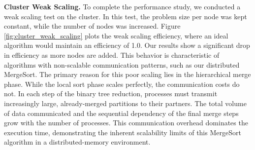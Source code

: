 \documentclass[10pt]{article}
\begin{document}
\textbf{Cluster Weak Scaling.} To complete the performance study, we conducted a weak scaling test on the cluster. In this test, the problem size per node was kept constant, while the number of nodes was increased. Figure \ref{fig:cluster_weak_scaling} plots the weak scaling efficiency, where an ideal algorithm would maintain an efficiency of 1.0. Our results show a significant drop in efficiency as more nodes are added. This behavior is characteristic of algorithms with non-scalable communication patterns, such as our distributed MergeSort. The primary reason for this poor scaling lies in the hierarchical merge phase. While the local sort phase scales perfectly, the communication costs do not. In each step of the binary tree reduction, processes must transmit increasingly large, already-merged partitions to their partners. The total volume of data communicated and the sequential dependency of the final merge steps grow with the number of processes. This communication overhead dominates the execution time, demonstrating the inherent scalability limits of this MergeSort algorithm in a distributed-memory environment.
\end{document}
